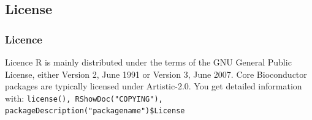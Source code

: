\documentclass[xcolor={table},c]{beamer}
\begin{document}
\subsection{License}
\begin{frame}\frametitle{Licence}
\begin{alertblock}{Licence}
R is mainly distributed under the terms of the GNU General
Public License, either Version 2, June 1991 or Version 3, June 2007. Core Bioconductor packages are typically licensed under Artistic-2.0. You get detailed information with: \texttt{license(), RShowDoc("COPYING"), packageDescription("packagename")\$License}
\end{alertblock}
\end{frame}

\appendix
\flushlinkimages
\end{document}
